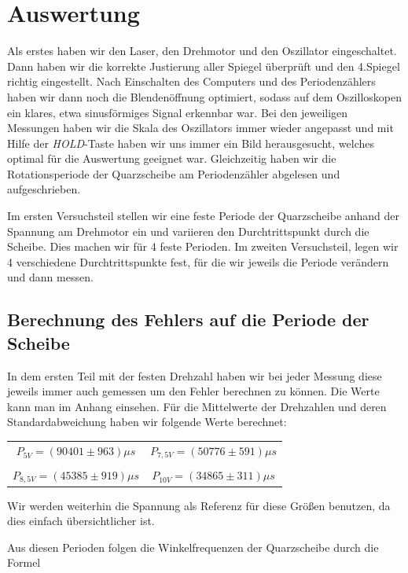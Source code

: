 \section{Auswertung}

Als erstes haben wir den Laser, den Drehmotor und den Oszillator eingeschaltet. Dann haben wir die korrekte Justierung aller Spiegel überprüft und den 4.Spiegel richtig eingestellt. Nach Einschalten des Computers und des Periodenzählers haben wir dann noch die Blendenöffnung optimiert, sodass auf dem Oszilloskopen ein klares, etwa sinusförmiges Signal erkennbar war. Bei den jeweiligen Messungen haben wir die Skala des Oszillators immer wieder angepasst und mit Hilfe der \emph{HOLD}-Taste haben wir uns immer ein Bild herausgesucht, welches optimal für die Auswertung geeignet war. Gleichzeitig haben wir die Rotationsperiode der Quarzscheibe am Periodenzähler abgelesen und aufgeschrieben.

Im ersten Versuchsteil stellen wir eine feste Periode der Quarzscheibe anhand der Spannung am Drehmotor ein und variieren den Durchtrittspunkt durch die Scheibe. Dies machen wir für 4 feste Perioden. Im zweiten Versuchsteil, legen wir 4 verschiedene Durchtrittspunkte fest, für die wir jeweils die Periode verändern und dann messen.

\subsection{Berechnung des Fehlers auf die Periode der Scheibe}

In dem ersten Teil mit der festen Drehzahl haben wir bei jeder Messung diese jeweils immer auch gemessen um den Fehler berechnen zu können. Die Werte kann man im Anhang einsehen. Für die Mittelwerte der Drehzahlen und deren Standardabweichung haben wir folgende Werte berechnet:

\begin{center}
\begin{tabular}[H]{c c}
$P_{5V}=(90401 \pm 963) \mu s$ & $P_{7,5V}=(50776 \pm 591) \mu s$ \\
 & \\
$P_{8,5V}=(45385 \pm 919) \mu s$ & $P_{10V}=(34865 \pm 311) \mu s$
\end{tabular}
\end{center}

Wir werden weiterhin die Spannung als Referenz für diese Größen benutzen, da dies einfach übersichtlicher ist.

Aus diesen Perioden folgen die Winkelfrequenzen der Quarzscheibe durch die Formel

